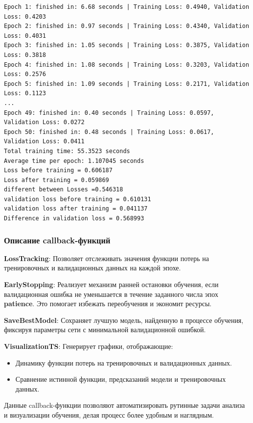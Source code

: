 \begin{lstlisting}[language=Tex, breaklines, caption=Пример получения данных от callback-функций]
Epoch 1: finished in: 6.68 seconds | Training Loss: 0.4940, Validation Loss: 0.4203
Epoch 2: finished in: 0.97 seconds | Training Loss: 0.4340, Validation Loss: 0.4031
Epoch 3: finished in: 1.05 seconds | Training Loss: 0.3875, Validation Loss: 0.3818
Epoch 4: finished in: 1.08 seconds | Training Loss: 0.3203, Validation Loss: 0.2576
Epoch 5: finished in: 1.09 seconds | Training Loss: 0.2171, Validation Loss: 0.1123
...
Epoch 49: finished in: 0.40 seconds | Training Loss: 0.0597, Validation Loss: 0.0272
Epoch 50: finished in: 0.48 seconds | Training Loss: 0.0617, Validation Loss: 0.0411
Total training time: 55.3523 seconds
Average time per epoch: 1.107045 seconds
Loss before training = 0.606187
Loss after training = 0.059869
different between Losses =0.546318
validation loss before training = 0.610131
validation loss after training = 0.041137
Difference in validation loss = 0.568993
\end{lstlisting}

\subsubsection{Описание callback-функций}

\textbf{LossTracking}: Позволяет отслеживать значения функции потерь на тренировочных и валидационных данных на каждой эпохе.

\textbf{EarlyStopping}: Реализует механизм ранней остановки обучения, если валидационная ошибка не уменьшается в течение заданного числа эпох \textbf{patience}. Это помогает избежать переобучения и экономит ресурсы.

\textbf{SaveBestModel}: Сохраняет лучшую модель, найденную в процессе обучения, фиксируя параметры сети с минимальной валидационной ошибкой.

\textbf{VisualizationTS}: Генерирует графики, отображающие:
\begin{itemize}
    \item Динамику функции потерь на тренировочных и валидационных данных.
    \item Сравнение истинной функции, предсказаний модели и тренировочных данных.
\end{itemize}

Данные callback-функции позволяют автоматизировать рутинные задачи анализа и визуализации обучения, делая процесс более удобным и наглядным.

